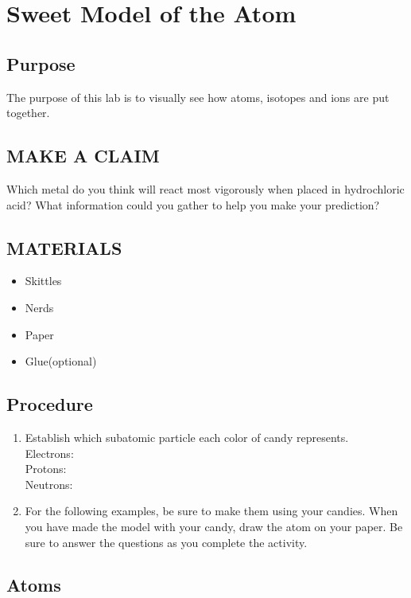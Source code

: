 \documentclass[a4paper,12pt]{exam}
\begin{document}
\section*{Sweet Model of the Atom}

\subsection*{Purpose}
The purpose of this lab is to visually see how atoms, isotopes and ions are put together.

\subsection*{MAKE A CLAIM}

Which metal do you think will react most vigorously when placed in
hydrochloric acid? What information could you gather to help you make
your prediction?


 \subsection*{MATERIALS}

 \begin{itemize}
    \item Skittles
    \item Nerds
    \item Paper
    \item Glue(optional)
\end{itemize}

 \subsection*{Procedure}

 \begin{enumerate}

    \item Establish which subatomic particle each color of candy represents.\\
        Electrons:\\
        Protons:\\
        Neutrons:
    \item For the following examples, be sure to make them using your candies. When you have made the model with your candy, draw the atom on your paper.
    Be sure to answer the questions as you complete the activity.

\end{enumerate}




\subsection*{Atoms}

\begin{questions}
    
\question {}
\vspace{8cm}

\question {}
\vspace{8cm}


\question {}
\vspace{8cm}

\question {}
\vspace{8cm}


\end{questions}
\end{document}
